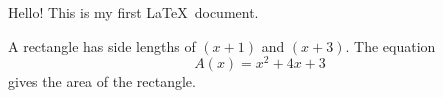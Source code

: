 \documentclass[11pt]{article}
\begin{document}
Hello! This is my first \LaTeX\ document.

A rectangle has side lengths of $(x+1)$ and $(x+3)$. The equation $${A(x) =x^2+4x+3}$$ gives the area of the rectangle.
\end{document}

